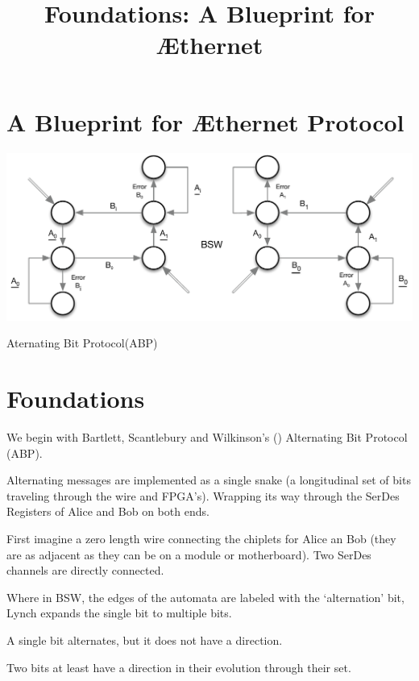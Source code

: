 \documentclass[../main.tex]{subfiles} %
\title{Foundations: A Blueprint for Æthernet}
\begin{document}
\section{A Blueprint for Æthernet Protocol}  
\begin{marginfigure}
  \includegraphics[width=1.2\linewidth]{../Figures/BSW.pdf}
  \caption{Aternating Bit Protocol(ABP)}
\end{marginfigure}

\section{Foundations}

We begin with Bartlett, Scantlebury and Wilkinson's  (\cite{BSW})  Alternating Bit Protocol (ABP).

Alternating messages are implemented as a single snake (a longitudinal set of bits traveling through the wire and FPGA's). Wrapping its way through the SerDes Registers of Alice and Bob on both ends.

First imagine a zero length wire connecting the chiplets for Alice an Bob (they are as adjacent as they can be on a module or motherboard). Two SerDes channels are directly connected. 

Where in BSW, the edges of the automata are labeled with the `alternation' bit, Lynch expands the single bit to multiple bits.

A single bit alternates, but it does not have a direction.

\begin{highlightbox}
Two bits at least have a direction in their evolution through their set.
\end{highlightbox}
\end{document}
